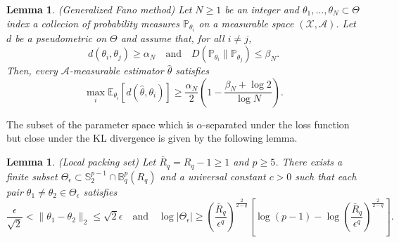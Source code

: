 \documentclass[11pt]{article}
\newtheorem{lemma}[theorem]{Lemma}
\newcommand{\E}{\mathbb{E}}
\newcommand{\B}{\mathbb{B}}
\renewcommand{\P}{\mathbb{P}}
\begin{document}
\begin{lemma}\label{lemma311} (Generalized Fano method) Let $N\ge 1$ be an integer and $\theta_1,\dots,\theta_N\subset\Theta$ index a collecion of probability measures $\P_{\theta_i}$ on a measurable space $(\mathcal{X}, \mathcal{A})$. Let $d$ be a pseudometric on $\Theta$ and assume that, for all $i\neq j$,
\begin{equation*}
d(\theta_i, \theta_j) \ge \alpha_N \quad \text{and} \quad D(\P_{\theta_i}\|\P_{\theta_j}) \le \beta_N.
\end{equation*}
Then, every $\mathcal{A}$-measurable estimator $\hat\theta$ satisfies
\begin{equation*}
\max_i \E_{\theta_i}[d(\hat\theta,\theta_i)] \ge \frac{\alpha_N}{2}\left(1 - \frac{\beta_N + \log 2}{\log N}\right).
\end{equation*}
\end{lemma}
The subset of the parameter space which is $\alpha$-separated under the loss function but close under the KL divergence is given by the following lemma.
\begin{lemma}\label{lemma312}(Local packing set) Let $\bar R_q = R_q-1\ge 1$ and $p\ge 5$. There exists a finite subset $\Theta_\epsilon\subset \mathbb{S}^{p-1}_2\cap \B^p_q(R_q)$ and a universal constant $c>0$ such that each pair $\theta_1\neq\theta_2\in\Theta_\epsilon$ satisfies
\begin{equation*}
\frac{\epsilon}{\sqrt{2}}<\|\theta_1 - \theta_2\|_2\le \sqrt{2}\epsilon \quad \text{and}\quad \log|\Theta_\epsilon| \ge \left(\frac{\bar R_q}{\epsilon^q}\right)^{\frac{2}{2-q}}\left[\log (p-1) - \log \left(\frac{\bar R_q}{\epsilon^q}\right)^{\frac{2}{2-q}}\right].
\end{equation*}
\end{lemma}
\end{document}
